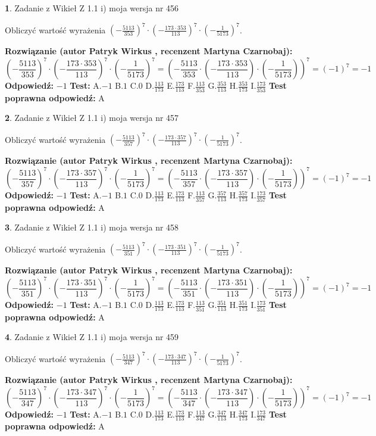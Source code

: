 \documentclass[12pt, a4paper]{article}
\theoremstyle{definition} %
\newtheorem{zad}{}
\newcommand{\zadStart}[1]{\begin{zad}#1\newline}
\newcommand{\zadStop}{\end{zad}}
\newcommand{\rozwStart}[2]{\noindent \textbf{Rozwiązanie (autor #1 , recenzent #2): }\newline}
\newcommand{\rozwStop}{\newline}
\newcommand{\odpStart}{\noindent \textbf{Odpowiedź:}\newline}
\newcommand{\odpStop}{\newline}
\newcommand{\testStart}{\noindent \textbf{Test:}\newline}
\newcommand{\testStop}{\newline}
\newcommand{\kluczStart}{\noindent \textbf{Test poprawna odpowiedź:}\newline}
\newcommand{\kluczStop}{\newline}
\begin{document}
\zadStart{Zadanie z Wikieł Z 1.1 i) moja wersja nr 456}

Obliczyć wartość wyrażenia $(-\frac{5113}{353})^{7} \cdot (-\frac{173 \cdot 353}{113})^{7} \cdot (-\frac{1}{5173})^{7}$.
\zadStop
\rozwStart{Patryk Wirkus}{Martyna Czarnobaj}
$$(-\frac{5113}{353})^{7} \cdot (-\frac{173 \cdot 353}{113})^{7} \cdot (-\frac{1}{5173})^{7} = (-\frac{5113}{353} \cdot (-\frac{173 \cdot 353}{113}) \cdot (-\frac{1}{5173}))^{7} = (-1)^{7} = -1$$
\rozwStop
\odpStart
$-1$
\odpStop
\testStart
A.$-1$ B.$1$ C.$0$ D.$\frac{113}{173}$ E.$\frac{173}{113}$
F.$\frac{113}{353}$ G.$\frac{353}{113}$
H.$\frac{353}{173}$
I.$\frac{173}{353}$
\testStop
\kluczStart
A
\kluczStop



\zadStart{Zadanie z Wikieł Z 1.1 i) moja wersja nr 457}

Obliczyć wartość wyrażenia $(-\frac{5113}{357})^{7} \cdot (-\frac{173 \cdot 357}{113})^{7} \cdot (-\frac{1}{5173})^{7}$.
\zadStop
\rozwStart{Patryk Wirkus}{Martyna Czarnobaj}
$$(-\frac{5113}{357})^{7} \cdot (-\frac{173 \cdot 357}{113})^{7} \cdot (-\frac{1}{5173})^{7} = (-\frac{5113}{357} \cdot (-\frac{173 \cdot 357}{113}) \cdot (-\frac{1}{5173}))^{7} = (-1)^{7} = -1$$
\rozwStop
\odpStart
$-1$
\odpStop
\testStart
A.$-1$ B.$1$ C.$0$ D.$\frac{113}{173}$ E.$\frac{173}{113}$
F.$\frac{113}{357}$ G.$\frac{357}{113}$
H.$\frac{357}{173}$
I.$\frac{173}{357}$
\testStop
\kluczStart
A
\kluczStop



\zadStart{Zadanie z Wikieł Z 1.1 i) moja wersja nr 458}

Obliczyć wartość wyrażenia $(-\frac{5113}{351})^{7} \cdot (-\frac{173 \cdot 351}{113})^{7} \cdot (-\frac{1}{5173})^{7}$.
\zadStop
\rozwStart{Patryk Wirkus}{Martyna Czarnobaj}
$$(-\frac{5113}{351})^{7} \cdot (-\frac{173 \cdot 351}{113})^{7} \cdot (-\frac{1}{5173})^{7} = (-\frac{5113}{351} \cdot (-\frac{173 \cdot 351}{113}) \cdot (-\frac{1}{5173}))^{7} = (-1)^{7} = -1$$
\rozwStop
\odpStart
$-1$
\odpStop
\testStart
A.$-1$ B.$1$ C.$0$ D.$\frac{113}{173}$ E.$\frac{173}{113}$
F.$\frac{113}{351}$ G.$\frac{351}{113}$
H.$\frac{351}{173}$
I.$\frac{173}{351}$
\testStop
\kluczStart
A
\kluczStop



\zadStart{Zadanie z Wikieł Z 1.1 i) moja wersja nr 459}

Obliczyć wartość wyrażenia $(-\frac{5113}{347})^{7} \cdot (-\frac{173 \cdot 347}{113})^{7} \cdot (-\frac{1}{5173})^{7}$.
\zadStop
\rozwStart{Patryk Wirkus}{Martyna Czarnobaj}
$$(-\frac{5113}{347})^{7} \cdot (-\frac{173 \cdot 347}{113})^{7} \cdot (-\frac{1}{5173})^{7} = (-\frac{5113}{347} \cdot (-\frac{173 \cdot 347}{113}) \cdot (-\frac{1}{5173}))^{7} = (-1)^{7} = -1$$
\rozwStop
\odpStart
$-1$
\odpStop
\testStart
A.$-1$ B.$1$ C.$0$ D.$\frac{113}{173}$ E.$\frac{173}{113}$
F.$\frac{113}{347}$ G.$\frac{347}{113}$
H.$\frac{347}{173}$
I.$\frac{173}{347}$
\testStop
\kluczStart
A
\kluczStop
\end{document}
